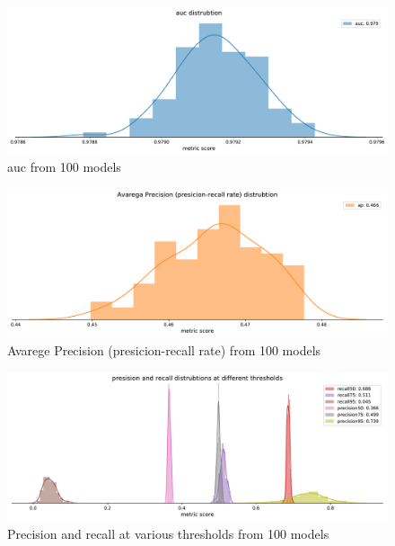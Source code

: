\documentclass[a4paper]{article}
\begin{document}

\begin{figure}[!htb]
	\centering
	\includegraphics[scale=0.4]{auc_out_20.pdf}
    \caption{\footnotesize{auc from 100 models}}%
\end{figure}



\begin{figure}[!htb]
	\centering
	\includegraphics[scale=0.4]{ap_out_20.pdf}
    \caption{\footnotesize{Avarege Precision (presicion-recall rate) from 100 models}}%
\end{figure}


\begin{figure}[!htb]
	\centering
	\includegraphics[scale=0.4]{recall_prec_out_20.pdf}
    \caption{\footnotesize{Precision and recall at various thresholds from 100 models}}%
\end{figure}
\end{document}
